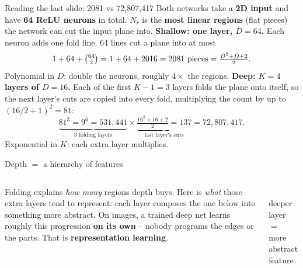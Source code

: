 \documentclass[aspectratio=43]{beamer}
\begin{document}
\begin{frame}{Reading the last slide: 2081 vs 72{,}807{,}417}
  \small
  Both networks take a \textbf{2D input} and have \textbf{64 ReLU neurons} in total. $N_r$ is
  the \textbf{most linear regions} (flat pieces) the network can cut the input plane into.
  \vskip 6pt
  \textbf{Shallow: one layer, $D=64$.} Each neuron adds one fold line. 64 lines cut a plane
  into at most
  \[ 1 + 64 + \tbinom{64}{2} = 1 + 64 + 2016 = 2081 \text{ pieces} = \tfrac{D^2+D+2}{2}. \]
  Polynomial in $D$: double the neurons, roughly $4\times$ the regions.
  \vskip 4pt
  \textbf{Deep: $K=4$ layers of $D=16$.} Each of the first $K-1=3$ layers folds the plane onto
  itself, so the next layer's cuts are copied into every fold, multiplying the count by up to
  $(16/2+1)^2 = 81$:
  \[ \underbrace{81^3 = 9^6 = 531{,}441}_{\text{3 folding layers}} \times
     \underbrace{\tfrac{16^2+16+2}{2} = 137}_{\text{last layer's cuts}} = 72{,}807{,}417. \]
  Exponential in $K$: each extra layer multiplies.
  \vfill
\end{frame}

\begin{frame}{Depth $=$ a hierarchy of features}
  \begin{columns}[T]
    Folding explains \emph{how many} regions depth buys. Here is \emph{what} those extra layers
    tend to represent: each layer composes the one below into something more abstract.
    \vskip 6pt
    On images, a trained deep net learns roughly this progression \textbf{on its own} -- nobody
    programs the edges or the parts. That is \textbf{representation learning}.
    \begin{center}
    \\[4pt]
    \scriptsize deeper layer $=$ more abstract feature
    \end{center}
  \end{columns}
\end{frame}
\end{document}
